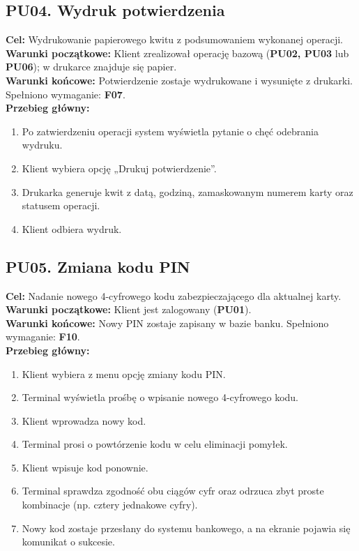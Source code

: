 \documentclass[12pt]{article}
\begin{document}
\subsection*{PU04. Wydruk potwierdzenia}
\textbf{Cel:} Wydrukowanie papierowego kwitu z podsumowaniem wykonanej operacji.\\
\textbf{Warunki początkowe:} Klient zrealizował operację bazową (\textbf{PU02, PU03} lub \textbf{PU06}); w drukarce znajduje się papier.\\
\textbf{Warunki końcowe:} Potwierdzenie zostaje wydrukowane i wysunięte z drukarki. Spełniono wymaganie: \textbf{F07}.\\
\textbf{Przebieg główny:}
\begin{enumerate}
    \item Po zatwierdzeniu operacji system wyświetla pytanie o chęć odebrania wydruku.
    \item Klient wybiera opcję „Drukuj potwierdzenie”.
    \item Drukarka generuje kwit z datą, godziną, zamaskowanym numerem karty oraz statusem operacji.
    \item Klient odbiera wydruk.
\end{enumerate}

\subsection*{PU05. Zmiana kodu PIN}
\textbf{Cel:} Nadanie nowego 4-cyfrowego kodu zabezpieczającego dla aktualnej karty.\\
\textbf{Warunki początkowe:} Klient jest zalogowany (\textbf{PU01}).\\
\textbf{Warunki końcowe:} Nowy PIN zostaje zapisany w bazie banku. Spełniono wymaganie: \textbf{F10}.\\
\textbf{Przebieg główny:}
\begin{enumerate}
    \item Klient wybiera z menu opcję zmiany kodu PIN.
    \item Terminal wyświetla prośbę o wpisanie nowego 4-cyfrowego kodu.
    \item Klient wprowadza nowy kod.
    \item Terminal prosi o powtórzenie kodu w celu eliminacji pomyłek.
    \item Klient wpisuje kod ponownie.
    \item Terminal sprawdza zgodność obu ciągów cyfr oraz odrzuca zbyt proste kombinacje (np. cztery jednakowe cyfry).
    \item Nowy kod zostaje przesłany do systemu bankowego, a na ekranie pojawia się komunikat o sukcesie.
\end{enumerate}
\end{document}
